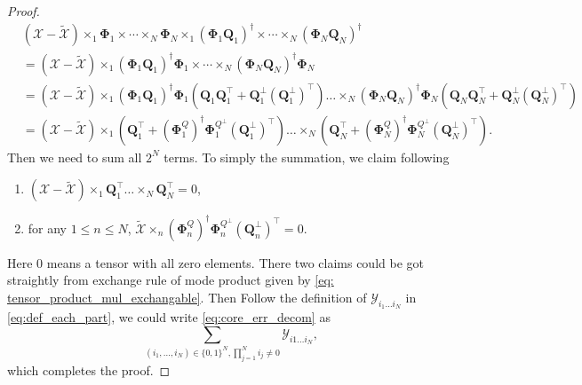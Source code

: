 \begin{proof}
\begin{equation}
\begin{aligned}
&(\mathscr{X} -  \tilde{\mathscr{X}})\times_1 \mathbf{\Phi}_1 \times \cdots \times_N \mathbf{\Phi}_N  \times_1 (\mathbf{\Phi}_1 \mathbf{Q}_1)^\dag \times \cdots \times_N (\mathbf{\Phi}_N \mathbf{Q}_N)^\dag \\
& =(\mathscr{X} -  \tilde{\mathscr{X}})\times_1 (\mathbf{\Phi}_1\mathbf{Q}_1)^\dag \mathbf{\Phi}_1 \times \cdots \times_N (\mathbf{\Phi}_N\mathbf{Q}_N)^\dag \mathbf{\Phi}_N \\
& =  (\mathscr{X} -  \tilde{\mathscr{X}}) \times_1 (\mathbf{\Phi}_1\mathbf{Q}_1)^\dag \mathbf{\Phi}_1(\mathbf{Q}_1\mathbf{Q}_1^\top + \mathbf{Q}_1^\bot (\mathbf{Q}_1^\bot)^\top)\dots \times_N (\mathbf{\Phi}_N\mathbf{Q}_N)^\dag \mathbf{\Phi}_N(\mathbf{Q}_N\mathbf{Q}_N^\top + \mathbf{Q}_N^\bot (\mathbf{Q}_N^\bot)^\top)\\
& = (\mathscr{X} -  \tilde{\mathscr{X}}) \times_1 (\mathbf{Q}_1^\top + (\mathbf{\Phi}_1^Q)^\dag  \mathbf{\Phi}_1^{Q^\bot}(\mathbf{Q}_1^\bot)^\top)\dots \times_N (\mathbf{Q}_N^\top + (\mathbf{\Phi}_N^Q)^\dag  \mathbf{\Phi}_N^{Q^\bot}(\mathbf{Q}_N^\bot)^\top).
\end{aligned}
\end{equation}
Then we need to sum all $2^N$ terms. To simply the summation, we claim following
\begin{enumerate}
\item $(\mathscr{X} - \tilde{\mathscr{X}})\times_1 \mathbf{Q}_1^\top\dots \times_N \mathbf{Q}_N^\top = 0$,
\item for any $1\le n\le N$, $\tilde{\mathscr{X}}\times_n (\mathbf{\Phi}_n^Q)^\dag  \mathbf{\Phi}_n^{Q^\bot}(\mathbf{Q}_n^\bot)^\top =  0$.
\end{enumerate}
Here $0$ means a tensor with all zero elements. There two claims could be got straightly from exchange rule of mode product given by \ref{eq: tensor_product_mul_exchangable}. Then Follow the definition of $\mathscr{Y}_{i_1\dots i_N}$ in \eqref{eq:def_each_part},
we could write \eqref{eq:core_err_decom} as 
\begin{equation}
\sum_{(i_1,\dots, i_N) \in \{0,1\}^N, \prod_{j=1}^N i_j \neq 0} \mathscr{Y}_{i1\dots i_N},
\end{equation}
which completes the proof.
\end{proof}
